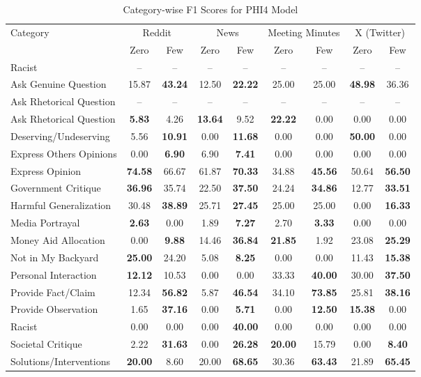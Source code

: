 \begin{table*}[htbp]
\centering
\begin{tabular}{l *{8}{c}}
\toprule
Category & \multicolumn{2}{c}{Reddit} & \multicolumn{2}{c}{News} & \multicolumn{2}{c}{Meeting Minutes} & \multicolumn{2}{c}{X (Twitter)} \\
& Zero & Few & Zero & Few & Zero & Few & Zero & Few \\
\midrule
Racist & -- & -- & -- & -- & -- & -- & -- & -- \\
Ask Genuine Question & 15.87 & \textbf{43.24} & 12.50 & \textbf{22.22} & 25.00 & 25.00 & \textbf{48.98} & 36.36 \\
Ask Rhetorical Question & -- & -- & -- & -- & -- & -- & -- & -- \\
Ask Rhetorical Question & \textbf{5.83} & 4.26 & \textbf{13.64} & 9.52 & \textbf{22.22} & 0.00 & 0.00 & 0.00 \\
Deserving/Undeserving & 5.56 & \textbf{10.91} & 0.00 & \textbf{11.68} & 0.00 & 0.00 & \textbf{50.00} & 0.00 \\
Express Others Opinions & 0.00 & \textbf{6.90} & 6.90 & \textbf{7.41} & 0.00 & 0.00 & 0.00 & 0.00 \\
Express Opinion & \textbf{74.58} & 66.67 & 61.87 & \textbf{70.33} & 34.88 & \textbf{45.56} & 50.64 & \textbf{56.50} \\
Government Critique & \textbf{36.96} & 35.74 & 22.50 & \textbf{37.50} & 24.24 & \textbf{34.86} & 12.77 & \textbf{33.51} \\
Harmful Generalization & 30.48 & \textbf{38.89} & 25.71 & \textbf{27.45} & 25.00 & 25.00 & 0.00 & \textbf{16.33} \\
Media Portrayal & \textbf{2.63} & 0.00 & 1.89 & \textbf{7.27} & 2.70 & \textbf{3.33} & 0.00 & 0.00 \\
Money Aid Allocation & 0.00 & \textbf{9.88} & 14.46 & \textbf{36.84} & \textbf{21.85} & 1.92 & 23.08 & \textbf{25.29} \\
Not in My Backyard & \textbf{25.00} & 24.20 & 5.08 & \textbf{8.25} & 0.00 & 0.00 & 11.43 & \textbf{15.38} \\
Personal Interaction & \textbf{12.12} & 10.53 & 0.00 & 0.00 & 33.33 & \textbf{40.00} & 30.00 & \textbf{37.50} \\
Provide Fact/Claim & 12.34 & \textbf{56.82} & 5.87 & \textbf{46.54} & 34.10 & \textbf{73.85} & 25.81 & \textbf{38.16} \\
Provide Observation & 1.65 & \textbf{37.16} & 0.00 & \textbf{5.71} & 0.00 & \textbf{12.50} & \textbf{15.38} & 0.00 \\
Racist & 0.00 & 0.00 & 0.00 & \textbf{40.00} & 0.00 & 0.00 & 0.00 & 0.00 \\
Societal Critique & 2.22 & \textbf{31.63} & 0.00 & \textbf{26.28} & \textbf{20.00} & 15.79 & 0.00 & \textbf{8.40} \\
Solutions/Interventions & \textbf{20.00} & 8.60 & 20.00 & \textbf{68.65} & 30.36 & \textbf{63.43} & 21.89 & \textbf{65.45} \\
\bottomrule
\end{tabular}
\centering\caption{Category-wise F1 Scores for PHI4 Model}
\label{tab:phi4_category_breakdown}
\end{table*}